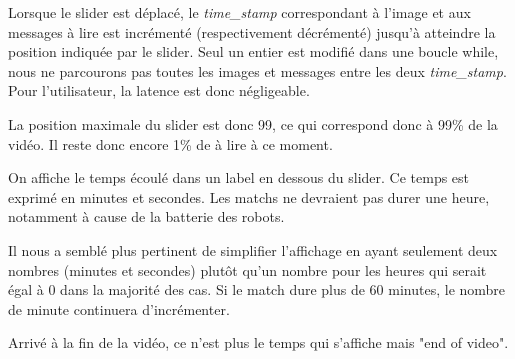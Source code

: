 Lorsque le slider est déplacé, le \textit{time\_stamp}
correspondant à l'image et aux messages à lire est incrémenté
(respectivement décrémenté) jusqu'à atteindre la position
indiquée par le slider. Seul un entier est modifié dans une
boucle while, nous ne parcourons pas toutes les images et
messages entre les deux \textit{time\_stamp}. Pour l'utilisateur,
la latence est donc négligeable. 
\bigskip

La position maximale du slider est donc 99, ce qui correspond
donc à 99\% de la vidéo. Il reste donc encore 1\% de à lire à ce
moment.
\bigskip

On affiche le temps écoulé dans un label en dessous du slider. Ce
temps est exprimé en minutes et secondes. Les matchs ne devraient
pas durer une heure, notamment à cause de la batterie des robots.

Il nous a semblé plus pertinent de simplifier l'affichage en
ayant seulement deux nombres (minutes et secondes) plutôt qu'un
nombre pour les heures qui serait égal à 0 dans la majorité des
cas. Si le match dure plus de 60 minutes, le nombre de minute
continuera d'incrémenter.
\bigskip

Arrivé à la fin de la vidéo, ce n'est plus le temps qui s'affiche
mais "end of video".
\bigskip